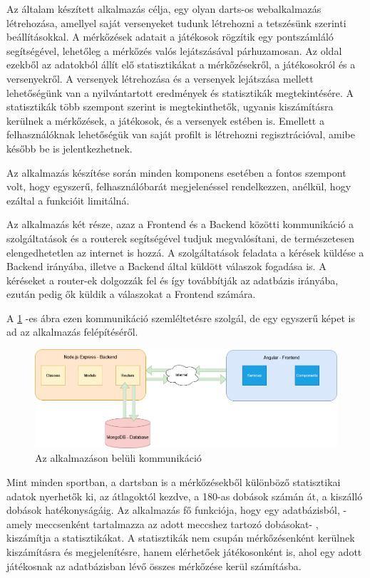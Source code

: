 
Az általam készített alkalmazás célja, egy olyan darts-os webalkalmazás létrehozása, amellyel saját versenyeket tudunk létrehozni a tetszésünk szerinti beállításokkal. A mérkőzések adatait a játékosok rögzítik egy pontszámláló segítségével, lehetőleg a mérkőzés valós lejátszásával párhuzamosan. Az oldal ezekből az adatokból állít elő statisztikákat a mérkőzésekről, a játékosokról és a versenyekről. A versenyek létrehozása és a versenyek lejátszása mellett lehetőségünk van a nyilvántartott eredmények és statisztikák megtekintésére. A statisztikák több szempont szerint is megtekinthetők, ugyanis kiszámításra kerülnek a mérkőzések, a játékosok, és a versenyek estében is. Emellett a felhasználóknak lehetőségük van saját profilt is létrehozni regisztrációval, amibe később be is jelentkezhetnek.

Az alkalmazás készítése során minden komponens esetében a fontos szempont volt, hogy egyszerű, felhasználóbarát megjelenéssel rendelkezzen, anélkül, hogy ezáltal a funkcióit limitálná.\newline

Az alkalmazás két része, azaz a Frontend és a Backend közötti kommunikáció a szolgáltatások és a routerek segítségével tudjuk megvalósítani, de természetesen elengedhetetlen az internet is hozzá. A szolgáltatások feladata a kérések küldése a Backend irányába, illetve a Backend által küldött válaszok fogadása is. A kéréseket a router-ek dolgozzák fel és így továbbítják az adatbázis irányába, ezután pedig ők küldik a válaszokat a Frontend számára.

A \ref{fig:network} -es ábra ezen kommunikáció szemléltetésre szolgál, de egy egyszerű képet is ad az alkalmazás felépítéséről.

\begin{figure}[h]
\centering
\includegraphics[scale=0.40]{images/DoubleOut_Network.drawio.png}
\caption{Az alkalmazáson belüli kommunikáció}
\label{fig:network}
\end{figure}

Mint minden sportban, a dartsban is a mérkőzésekből különböző statisztikai adatok nyerhetők ki, az átlagoktól kezdve, a 180-as dobások számán át, a kiszálló dobások hatékonyságáig. Az alkalmazás fő funkciója, hogy egy adatbázisból, - amely meccsenként tartalmazza az adott meccshez tartozó dobásokat- , kiszámítja a statisztikákat. A statisztikák nem csupán mérkőzésenként kerülnek kiszámításra és megjelenítésre, hanem elérhetőek játékosonként is, ahol egy adott játékosnak az adatbázisban lévő összes mérkőzése kerül számításba.

